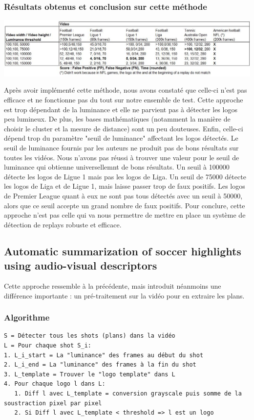 \documentclass[11pt]{article}
\begin{document}
\subsubsection{Résultats obtenus et conclusion sur cette méthode}
\label{sec:org29fccb7}
\begin{center}
\includegraphics[width=15cm]{robust_res.JPG}
\end{center}
Après avoir implémenté cette méthode, nous avons constaté que celle-ci n'est pas efficace et ne fonctionne pas du tout sur notre ensemble de test.
Cette approche est trop dépendant de la luminance et elle ne parvient pas à détecter les logos peu lumineux.
De plus, les bases mathématiques (notamment la manière de choisir le cluster et la mesure de distance) sont un peu douteuses.
Enfin, celle-ci dépend trop du paramètre "seuil de luminance" affectant les logos détectés.
Le seuil de luminance fournis par les auteurs ne produit pas de bons résultats sur toutes les vidéos.
Nous n'avons pas réussi à trouver une valeur pour le seuil de luminance qui obtienne universellemnt de bons résultats.
Un seuil à 100000 détecte les logos de Ligue 1 mais pas les logos de Liga.
Un seuil de 75000 détecte les logos de Liga et de Ligue 1, mais laisse passer trop de faux positifs.
Les logos de Premier League quant à eux ne sont pas tous détectés avec un seuil à 50000, alors que ce seuil accepte un grand nombre de faux positifs.
Pour conclure, cette approche n'est pas celle qui va nous permettre de mettre en place un système de détection de replays robuste et efficace.

\subsection{Automatic summarization of soccer highlights using audio-visual descriptors}
\label{sec:orgd0f40e0}
Cette approche ressemble à la précédente, mais introduit néanmoins une différence importante : un pré-traitement sur la vidéo pour en extraire les plans.
\subsubsection{Algorithme}
\label{sec:org71b99fd}
\begin{verbatim}
S = Détecter tous les shots (plans) dans la vidéo
L = Pour chaque shot S_i:
1. L_i_start = La "luminance" des frames au début du shot
2. L_i_end = La "luminance" des frames à la fin du shot
3. L_template = Trouver le "logo template" dans L
4. Pour chaque logo l dans L:
   1. Diff l avec L_template = conversion grayscale puis somme de la soustraction pixel par pixel
   2. Si Diff l avec L_template < threshold => l est un logo
\end{verbatim}
\end{document}
